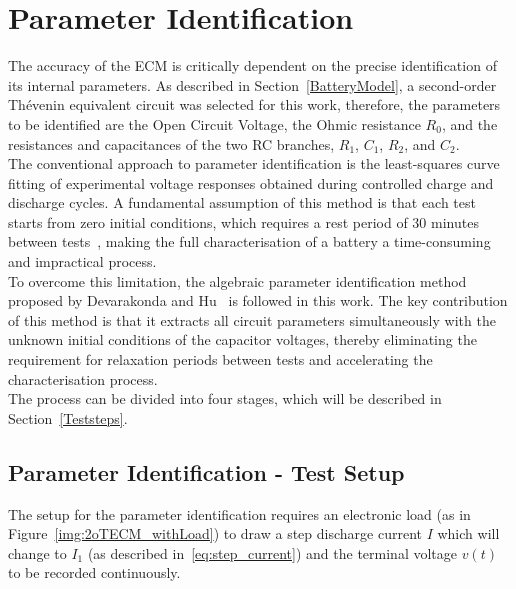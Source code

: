 \section{Parameter Identification}\label{Parameters}

The accuracy of the \acs{ECM} is critically dependent on the precise identification of its internal parameters.
As described in Section~\ref{BatteryModel}, a 
second-order Thévenin equivalent circuit was selected for this work, therefore, the parameters to be identified are  
the Open Circuit Voltage, the Ohmic resistance $R_0$, and the resistances and capacitances 
of the two RC branches, $R_1$, $C_1$, $R_2$, and $C_2$.
\\
The conventional approach to parameter identification is the least-squares curve fitting of experimental voltage 
responses obtained during controlled charge and discharge cycles. 
A fundamental assumption of this method is that each test starts from zero initial conditions, which requires a
rest period of 30 minutes between tests~\cite{DEVARAKONDA2014}, making the full characterisation of a battery a time-consuming and 
impractical process.
\\
To overcome this limitation, the algebraic parameter identification method proposed by Devarakonda and Hu~\cite{DEVARAKONDA2014} 
is followed in this work. The key contribution of this method is that it extracts all circuit parameters simultaneously 
with the unknown initial conditions of the capacitor voltages, thereby eliminating the requirement for 
relaxation periods between tests and accelerating the characterisation process.
\\
The process can be divided into four stages, which will be described in Section~\ref{Teststeps}.

\subsection{Parameter Identification - Test Setup}
The setup for the parameter identification requires an electronic load (as in Figure~\ref{img:2oTECM_withLoad}) 
to draw a step discharge current $I$ which
will change to $I_1$ (as described in~\eqref{eq:step_current}) and the terminal voltage $v(t)$ to be recorded continuously. 

